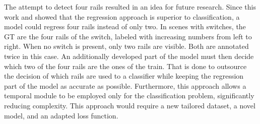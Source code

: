 \noindent The attempt to detect four rails resulted in an idea for future research.
Since this work and \cite{tepNet2024} showed that the regression approach is superior to classification, a model could regress four rails instead of only two.
In scenes with switches, the \ac{GT} are the four rails of the switch, labeled with increasing numbers from left to right.
When no switch is present, only two rails are visible.
Both are annotated twice in this case.
An additionally developed part of the model must then decide which two of the four rails are the ones of the train.
That is done to outsource the decision of which rails are used to a classifier while keeping the regression part of the model as accurate as possible.
Furthermore, this approach allows a temporal module to be employed only for the classification problem, significantly reducing complexity.
This approach would require a new tailored dataset, a novel model, and an adapted loss function.
